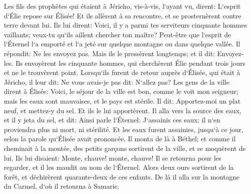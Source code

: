 \verse Les fils des prophètes qui étaient à Jéricho, vis-à-vis, l`ayant vu, dirent: L`esprit d`Élie repose sur Élisée! Et ils allèrent à sa rencontre, et se prosternèrent contre terre devant lui. 
\verse Ils lui dirent: Voici, il y a parmi tes serviteurs cinquante hommes vaillants; veux-tu qu`ils aillent chercher ton maître? Peut-être que l`esprit de l`Éternel l`a emporté et l`a jeté sur quelque montagne ou dans quelque vallée. Il répondit: Ne les envoyez pas. 
\verse Mais ils le pressèrent longtemps; et il dit: Envoyez-les. Ils envoyèrent les cinquante hommes, qui cherchèrent Élie pendant trois jours et ne le trouvèrent point. 
\verse Lorsqu`ils furent de retour auprès d`Élisée, qui était à Jéricho, il leur dit: Ne vous avais-je pas dit: N`allez pas? 
\verse Les gens de la ville dirent à Élisée: Voici, le séjour de la ville est bon, comme le voit mon seigneur; mais les eaux sont mauvaises, et le pays est stérile. 
\verse Il dit: Apportez-moi un plat neuf, et mettez-y du sel. Et ils le lui apportèrent. 
\verse Il alla vers la source des eaux, et il y jeta du sel, et dit: Ainsi parle l`Éternel: J`assainis ces eaux; il n`en proviendra plus ni mort, ni stérilité. 
\verse Et les eaux furent assainies, jusqu`à ce jour, selon la parole qu`Élisée avait prononcée. 
\verse Il monta de là à Béthel; et comme il cheminait à la montée, des petits garçons sortirent de la ville, et se moquèrent de lui. Ils lui disaient: Monte, chauve! monte, chauve! 
\verse Il se retourna pour les regarder, et il les maudit au nom de l`Éternel. Alors deux ours sortirent de la forêt, et déchirèrent quarante-deux de ces enfants. 
\verse De là il alla sur la montagne du Carmel, d`où il retourna à Samarie. 

